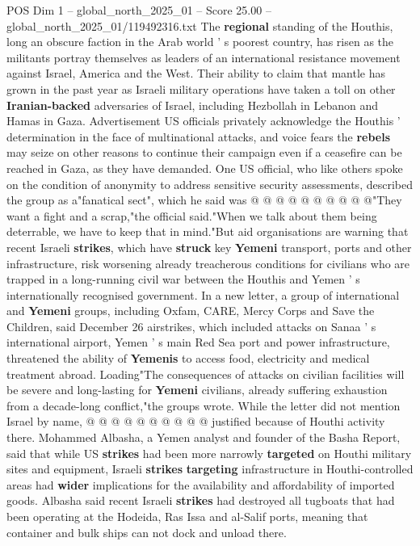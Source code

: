 \begin{textsample}{POS Dim 1 – global\_north\_2025\_01 – Score 25.00 – global\_north\_2025\_01/119492316.txt}
The \textbf{regional} standing of the Houthis, long an obscure faction in the Arab world ' s poorest country, has risen as the militants portray themselves as leaders of an international resistance movement against Israel, America and the West.
Their ability to claim that mantle has grown in the past year as Israeli military operations have taken a toll on other \textbf{Iranian-backed} adversaries of Israel, including Hezbollah in Lebanon and Hamas in Gaza.
Advertisement US officials privately acknowledge the Houthis ' determination in the face of multinational attacks, and voice fears the \textbf{rebels} may seize on other reasons to continue their campaign even if a ceasefire can be reached in Gaza, as they have demanded.
One US official, who like others spoke on the condition of anonymity to address sensitive security assessments, described the group as a"fanatical sect", which he said was @ @ @ @ @ @ @ @ @ @"They want a fight and a scrap,"the official said."When we talk about them being deterrable, we have to keep that in mind."But aid organisations are warning that recent Israeli \textbf{strikes}, which have \textbf{struck} key \textbf{Yemeni} transport, ports and other infrastructure, risk worsening already treacherous conditions for civilians who are trapped in a long-running civil war between the Houthis and Yemen ' s internationally recognised government.
In a new letter, a group of international and \textbf{Yemeni} groups, including Oxfam, CARE, Mercy Corps and Save the Children, said December 26 airstrikes, which included attacks on Sanaa ' s international airport, Yemen ' s main Red Sea port and power infrastructure, threatened the ability of \textbf{Yemenis} to access food, electricity and medical treatment abroad.
Loading"The consequences of attacks on civilian facilities will be severe and long-lasting for \textbf{Yemeni} civilians, already suffering exhaustion from a decade-long conflict,"the groups wrote.
While the letter did not mention Israel by name, @ @ @ @ @ @ @ @ @ @ justified because of Houthi activity there.
Mohammed Albasha, a Yemen analyst and founder of the Basha Report, said that while US \textbf{strikes} had been more narrowly \textbf{targeted} on Houthi military sites and equipment, Israeli \textbf{strikes} \textbf{targeting} infrastructure in Houthi-controlled areas had \textbf{wider} implications for the availability and affordability of imported goods.
Albasha said recent Israeli \textbf{strikes} had destroyed all tugboats that had been operating at the Hodeida, Ras Issa and al-Salif ports, meaning that container and bulk ships can not dock and unload there.

\end{textsample}
